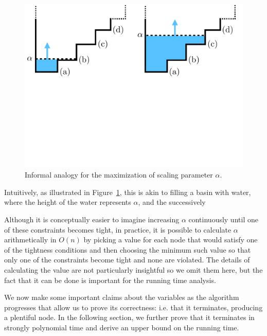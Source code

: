 \documentclass[11pt]{article}
\theoremstyle{definition}
\theoremstyle{definition}
\theoremstyle{definition}
\begin{document}
    \begin{figure}[b!]
    \centering
    \includegraphics[width=\textwidth]{figs/basin.pdf}
    \caption{
    \label{fig:alpha}
    Informal analogy for the maximization of scaling parameter $\alpha$.
    }
    \end{figure}
		Intuitively, as illustrated in Figure~\ref{fig:alpha}, this is akin to
		filling a basin with water, where the height of the water represents
		$\alpha$, and the successively

    Although it is conceptually easier to imagine increasing $\alpha$ continuously
    until one of these constraints becomes tight, in practice, it is possible to
    calculate $\alpha$ arithmetically in $O(n)$ by picking a value for each node
    that would satisfy one of the tightness conditions and then choosing the minimum
    such value so that only one of the constraints become tight and none are
    violated.
    The details of calculating the value are not particularly insightful so we omit them here, but the
    fact that it can be done is important for the running time analysis.

    We now make some important claims about the variables as the algorithm
    progresses that allow us to prove its correctness: i.e. that it terminates,
    producing a plentiful node.
    In the following section,
    we further prove that it terminates in strongly polynomial time and derive
    an upper bound on the running time.
\end{document}
